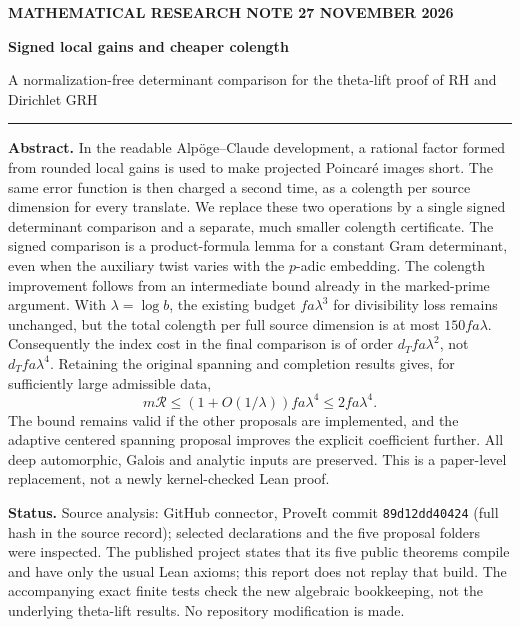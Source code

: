 \documentclass[11pt,letterpaper]{article}
\theoremstyle{remark}\newtheorem{remark}[theorem]{Remark}
\newcommand{\R}{\mathcal R}\newcommand{\E}{\mathcal E}\newcommand{\Lfour}{\mathcal L}\newcommand{\K}{\mathcal K}\newcommand{\G}{\mathcal G}\newcommand{\Gr}{\operatorname{Gram}}\newcommand{\rk}{\operatorname{rank}}\newcommand{\Height}{\operatorname{HeightLe}}
\begin{document}
\thispagestyle{empty}
{\small\sffamily\bfseries\color{accent} MATHEMATICAL RESEARCH NOTE \hfill 27 NOVEMBER 2026}\par\vspace{.22in}
{\huge\bfseries\color{ink} Signed local gains and cheaper colength\par}\vspace{6pt}
{\large A normalization-free determinant comparison for the theta-lift proof of RH and Dirichlet GRH}\par\vspace{9pt}\textcolor{accent}{\rule{\linewidth}{.8pt}}

\textbf{Abstract.} In the readable Alp\"oge--Claude development, a rational factor formed from rounded local gains is used to make projected Poincar\'e images short. The same error function is then charged a second time, as a colength per source dimension for every translate. We replace these two operations by a single signed determinant comparison and a separate, much smaller colength certificate. The signed comparison is a product-formula lemma for a constant Gram determinant, even when the auxiliary twist varies with the $p$-adic embedding. The colength improvement follows from an intermediate bound already in the marked-prime argument. With $\lambda=\log b$, the existing budget $fa\lambda^3$ for divisibility loss remains unchanged, but the total colength per full source dimension is at most $150fa\lambda$. Consequently the index cost in the final comparison is of order $d_T fa\lambda^2$, not $d_T fa\lambda^4$. Retaining the original spanning and completion results gives, for sufficiently large admissible data,
\[
  m\R\le (1+O(1/\lambda))fa\lambda^4\le 2fa\lambda^4.
\]
The bound remains valid if the other proposals are implemented, and the adaptive centered spanning proposal improves the explicit coefficient further. All deep automorphic, Galois and analytic inputs are preserved. This is a paper-level replacement, not a newly kernel-checked Lean proof.

\textbf{Status.} Source analysis: GitHub connector, ProveIt commit \texttt{89d12dd40424} (full hash in the source record); selected declarations and the five proposal folders were inspected. The published project states that its five public theorems compile and have only the usual Lean axioms; this report does not replay that build. The accompanying exact finite tests check the new algebraic bookkeeping, not the underlying theta-lift results. No repository modification is made.
\end{document}
